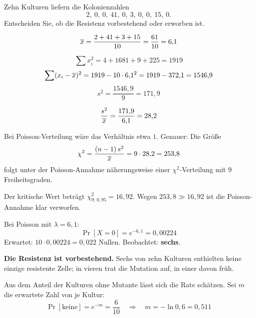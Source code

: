 \begin{aufgabe}
Zehn Kulturen liefern die Kolonienzahlen
\[ 2,\ 0,\ 0,\ 41,\ 0,\ 3,\ 0,\ 0,\ 15,\ 0 . \]
Entscheiden Sie, ob die Resistenz vorbestehend oder erworben ist.

\loesung
{}
\[ \overline{x} = \frac{2+41+3+15}{10} = \frac{61}{10} = 6{,}1 \]

\[ \sum x_i^2 = 4 + 1681 + 9 + 225 = 1919 \]
\[ \sum(x_i-\overline{x})^2 = 1919 - 10\cdot6{,}1^2 = 1919 - 372{,}1 = 1546{,}9 \]
\[ s^2 = \frac{1546{,}9}{9} = 171{,}9 \]

\[ \frac{s^2}{\overline{x}} = \frac{171{,}9}{6{,}1} = 28{,}2 \]

Bei Poisson-Verteilung wäre das Verhältnis etwa $1$. Genauer: Die Größe
\[ \chi^2 = \frac{(n-1)\,s^2}{\overline{x}} = 9 \cdot 28{,}2 = 253{,}8 \]
folgt unter der Poisson-Annahme näherungsweise einer $\chi^2$-Verteilung mit $9$ Freiheitsgraden.

Der kritische Wert beträgt $\chi^2_{9;\,0{,}95} = 16{,}92$. Wegen $253{,}8 \gg 16{,}92$ ist die Poisson-Annahme klar verworfen.

Bei Poisson mit $\lambda = 6{,}1$:
\[ \Pr[X=0] = e^{-6{,}1} = 0{,}00224 \]
Erwartet: $10 \cdot 0{,}00224 = 0{,}022$ Nullen. Beobachtet: \textbf{sechs}.

\begin{center}
\begin{minipage}{0.88\textwidth}
\end{minipage}
\end{center}

\begin{center}
\begin{minipage}{0.9\textwidth}
\textbf{Die Resistenz ist vorbestehend.} Sechs von zehn Kulturen enthielten keine einzige resistente Zelle; in vieren trat die Mutation auf, in einer davon früh.
\end{minipage}
\end{center}

Aus dem Anteil der Kulturen ohne Mutante lässt sich die Rate schätzen. Sei $m$ die erwartete Zahl von  je Kultur:
\[ \Pr[\text{keine}] = e^{-m} = \frac{6}{10} \quad\Longrightarrow\quad m = -\ln 0{,}6 = 0{,}511 \]


\end{aufgabe}
